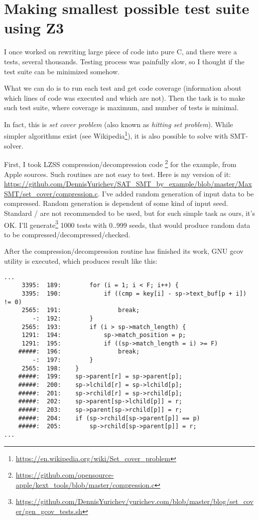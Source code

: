 \section{Making smallest possible test suite using Z3}
\label{set_cover}

I once worked on rewriting large piece of code into pure C, and there were a tests, several thousands.
Testing process was painfully slow, so I thought if the test suite can be minimized somehow.

What we can do is to run each test and get code coverage
(information about which lines of code was executed and which are not).
Then the task is to make such test suite, where coverage is maximum, and number of tests is minimal.

In fact, this is \emph{set cover problem} (also known as \emph{hitting set problem}).
While simpler algorithms exist (see Wikipedia\footnote{\url{https://en.wikipedia.org/wiki/Set_cover_problem}}),
it is also possible to solve with SMT-solver.

First, I took \ac{LZSS} compression/decompression code
\footnote{\url{https://github.com/opensource-apple/kext_tools/blob/master/compression.c}} for the example,
from Apple sources.
Such routines are not easy to test.
Here is my version of it:
\url{https://github.com/DennisYurichev/SAT_SMT_by_example/blob/master/MaxSMT/set_cover/compression.c}.
I've added random generation of input data to be compressed.
Random generation is dependent of some kind of input seed.
Standard / are not recommended to be used, but for such simple task as ours, it's OK.
I'll generate\footnote{\url{https://github.com/DennisYurichev/yurichev.com/blob/master/blog/set_cover/gen_gcov_tests.sh}}
1000 tests with 0..999 seeds, that would produce random data to be compressed/decompressed/checked.

After the compression/decompression routine has finished its work,
GNU gcov utility is executed, which produces result like this:

\begin{lstlisting}
...
     3395:  189:        for (i = 1; i < F; i++) {
     3395:  190:            if ((cmp = key[i] - sp->text_buf[p + i]) != 0)
     2565:  191:                break;
        -:  192:        }
     2565:  193:        if (i > sp->match_length) {
     1291:  194:            sp->match_position = p;
     1291:  195:            if ((sp->match_length = i) >= F)
    #####:  196:                break;
        -:  197:        }
     2565:  198:    }
    #####:  199:    sp->parent[r] = sp->parent[p];
    #####:  200:    sp->lchild[r] = sp->lchild[p];
    #####:  201:    sp->rchild[r] = sp->rchild[p];
    #####:  202:    sp->parent[sp->lchild[p]] = r;
    #####:  203:    sp->parent[sp->rchild[p]] = r;
    #####:  204:    if (sp->rchild[sp->parent[p]] == p)
    #####:  205:        sp->rchild[sp->parent[p]] = r;
...
\end{lstlisting}

